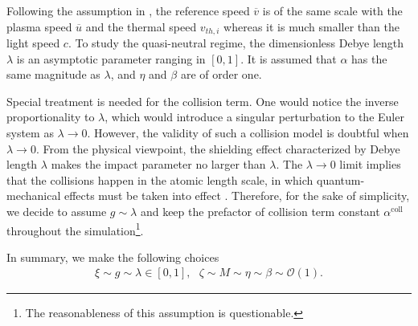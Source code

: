 \documentclass{article}
\begin{document}
Following the assumption in \cite{degond_2017}, the reference speed $\overline{v}$ is of the same scale with the plasma speed $\overline{u}$ and the thermal speed $v_{th,i}$ whereas it is much smaller than the light speed $c$. To study the quasi-neutral regime, the dimensionless Debye length $\lambda$ is an asymptotic parameter ranging in $[0,1]$. It is assumed that $\alpha$ has the same magnitude as $\lambda$, and $\eta$ and $\beta$ are of order one. 

Special treatment is needed for the collision term. One would notice the inverse proportionality to $\lambda$, which would introduce a singular perturbation to the Euler system as $\lambda \rightarrow 0$. However, the validity of such a collision model is doubtful when $\lambda \rightarrow 0$. From the physical viewpoint, the shielding effect characterized by Debye length $\lambda$ makes the impact parameter no larger than $\lambda$. The $\lambda \rightarrow 0$ limit implies that the collisions happen in the atomic length scale, in which quantum-mechanical effects must be taken into effect \citep{frank_1972}. Therefore, for the sake of simplicity, we decide to assume $g \sim \lambda$ and keep the prefactor of collision term constant $\alpha^{\text{coll}}$ throughout the simulation\footnote{The reasonableness of this assumption is questionable.}.  

In summary, we make the following choices
\begin{align*}
    \xi \sim g \sim \lambda \in [0,1], \ \ \ \zeta \sim M \sim \eta \sim \beta \sim \mathcal{O}(1).
\end{align*}
\end{document}
